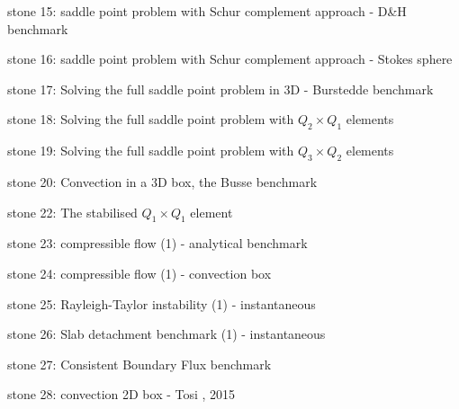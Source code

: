 {\noindent stone 15: saddle point problem with Schur complement approach - D\&H benchmark 


\noindent stone 16: saddle point problem with Schur complement approach - Stokes sphere 


\noindent stone 17: Solving the full saddle point problem in 3D - Burstedde benchmark \cite{dobo04} 


\noindent stone 18: Solving the full saddle point problem with $Q_2\times Q_1$ elements 


\noindent stone 19: Solving the full saddle point problem with $Q_3\times Q_2$ elements 


\noindent stone 20: Convection in a 3D box, the Busse benchmark \cite{bucc93}


\noindent stone 22: The stabilised $Q_1 \times Q_1$ element 


\noindent stone 23: compressible flow (1) - analytical benchmark 


\noindent stone 24: compressible flow (1) - convection box 


\noindent stone 25: Rayleigh-Taylor instability (1) - instantaneous \cite{vaks97}


\noindent stone 26: Slab detachment benchmark (1) - instantaneous 


\noindent stone 27: Consistent Boundary Flux benchmark


\noindent stone 28: convection 2D box - Tosi \etal, 2015


}
